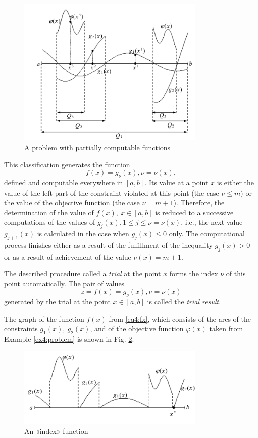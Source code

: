 \begin{figure}[h]
  \label{fig:4_2}
  \centering
  \includegraphics[width=0.8\textwidth]{figures/4_2.png}
  \caption{A problem with partially computable functions}
\end{figure}

This classification generates the function
\begin{equation}
  \label{eq4:fx}
  f(x)=g_\nu(x),\nu=\nu(x),
\end{equation}
defined and computable everywhere in $[a,b]$. Its value at a point $x$ is either the value of the left part of the constraint violated at this point (the case $\nu\le m$)  or the value of the objective function (the case $\nu=m+1$). Therefore, the determination of the value of $f(x),\:x\in[a,b]$  is reduced to a successive computations of the values of $g_j(x), 1\le j\le \nu=\nu(x)$, i.e., the next value $g_{j+1}(x)$ is calculated in the case when $g_j(x)\le 0$ only. The computational process finishes either as a result of the fulfillment of the inequality $g_j(x)>0$ or as a result of achievement of the value $\nu(x)=m+1$.

The described procedure called a \emph{trial} at the point $x$ forms the index $\nu$ of this point automatically. The pair of values
\begin{equation}
  z=f(x)=g_\nu(x),\nu=\nu(x)
\end{equation}
generated by the trial at the point $x\in[a,b]$ is called the \emph{trial result}.

The graph of the function $f(x)$ from \eqref{eq4:fx}, which consists of the arcs of the constraints $g_1(x),\:g_2(x)$, and of the objective function $\varphi(x)$ taken from Example \ref{ex4:problem} is shown in Fig. \ref{fig:4_3}.

\begin{figure}[h]
  \label{fig:4_3}
  \centering
  \includegraphics[width=0.8\textwidth]{figures/4_3.png}
  \caption{An «index» function}
\end{figure}

%
